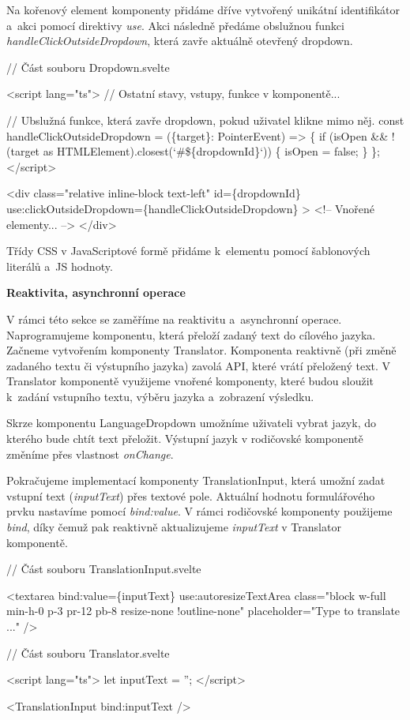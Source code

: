 Na kořenový element komponenty přidáme dříve vytvořený unikátní identifikátor a~akci pomocí direktivy \emph{use}. 
Akci následně předáme obslužnou funkci \emph{handleClickOutsideDropdown}, která zavře aktuálně otevřený dropdown.

\begin{prog}
// Část souboru Dropdown.svelte

<script lang="ts">
  // Ostatní stavy, vstupy, funkce v komponentě...

  // Ubslužná funkce, která zavře dropdown, pokud uživatel klikne mimo něj.
  const handleClickOutsideDropdown = (\{target\}: PointerEvent) => \{
    if (isOpen && !(target as HTMLElement).closest(`#\$\{dropdownId\}`)) \{
      isOpen = false;
    \}
  \};
</script>
  
<div
  class="relative inline-block text-left"
  id=\{dropdownId\}
  use:clickOutsideDropdown=\{handleClickOutsideDropdown\}
>
  <!-- Vnořené elementy... -->
</div>
\end{prog}

Třídy CSS v JavaScriptové formě přidáme k~elementu pomocí šablonových literálů a~JS hodnoty.

\begin{flushleft}
  \textbf{Reaktivita, asynchronní operace}
\end{flushleft}

V rámci této sekce se zaměříme na reaktivitu a~asynchronní operace. Naprogramujeme komponentu, která přeloží zadaný text do cílového jazyka. 
Začneme vytvořením komponenty Translator. Komponenta reaktivně (při změně zadaného textu či výstupního jazyka) zavolá API, které vrátí přeložený text. 
V Translator komponentě využijeme vnořené komponenty, které budou sloužit k~zadání vstupního textu, výběru jazyka a~zobrazení výsledku.

Skrze komponentu LanguageDropdown umožníme uživateli vybrat jazyk, do kterého bude chtít text přeložit. Výstupní jazyk v rodičovské komponentě změníme přes vlastnost \emph{onChange}.

Pokračujeme implementací komponenty TranslationInput, která umožní zadat vstupní text (\emph{inputText}) přes textové pole. Aktuální hodnotu formulářového prvku nastavíme pomocí \emph{bind:value}. 
V rámci rodičovské komponenty použijeme \emph{bind}, díky čemuž pak reaktivně aktualizujeme \emph{inputText} v Translator komponentě.

\begin{prog}
// Část souboru TranslationInput.svelte

<textarea
  bind:value=\{inputText\}
  use:autoresizeTextArea
  class="block w-full min-h-0 p-3 pr-12 pb-8 resize-none !outline-none"
  placeholder="Type to translate ..."
/>

// Část souboru Translator.svelte

<script lang="ts">
  let inputText = '';
</script>

<TranslationInput bind:inputText />
\end{prog}

